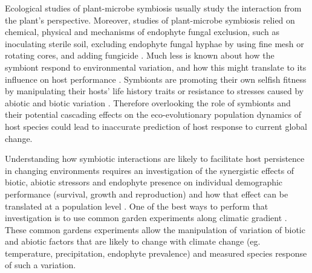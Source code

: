 \documentclass[12pt,english]{article}
\begin{document}
\begin{spacing}{1.9}
Ecological studies of plant-microbe symbiosis usually study the interaction from the plant’s perspective. 
Moreover, studies of plant-microbe symbiosis relied on chemical, physical and  mechanisms of endophyte fungal exclusion, such as inoculating sterile soil, excluding endophyte fungal hyphae by using fine mesh or rotating cores, and adding fungicide \citep{bennett2022costs}. 
Much less is known about how the symbiont respond to environmental variation, and how this might translate to its influence on host performance \citep{garcia2014symbiont}. 
Symbionts are promoting their own selfish fitness by manipulating their hosts' life history traits or resistance to stresses caused by abiotic and biotic variation \citep{kazenel2015mutualistic,giauque2019endophyte,saikkonen1998fungal}. 
Therefore overlooking the role of symbionts and their potential cascading effects on the eco-evolutionary population dynamics of host species  could lead to inaccurate prediction of host response to current global change. 

Understanding how symbiotic interactions are likely to facilitate host persistence in changing environments requires an investigation of the synergistic effects of biotic, abiotic stressors and endophyte presence on individual demographic performance (survival, growth and reproduction) and how that effect can be translated at a population level \citep{bruno2003inclusion,de2006fungal}. 
One of the best ways to perform that investigation is to use common garden experiments along climatic gradient \citep{schwinning2022common}.
These common gardens experiments allow the manipulation of variation of biotic and abiotic factors that are likely to change with climate change (eg. temperature, precipitation, endophyte prevalence) and measured species response of such a variation.  


\end{spacing}
\end{document}
